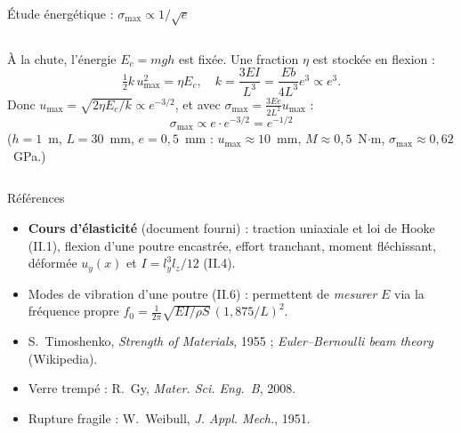 \documentclass[11pt,aspectratio=169]{beamer}
\begin{document}
\begin{frame}{Étude énergétique : $\sigma_{\max}\propto 1/\sqrt{e}$}
  \begin{columns}[c]
    \footnotesize
    À la chute, l'énergie $E_c=mgh$ est fixée. Une fraction $\eta$ est stockée en
    flexion :
    \[ \tfrac12 k\,u_{\max}^{2}=\eta E_c,\quad k=\frac{3EI}{L^{3}}=\frac{Eb}{4L^{3}}e^{3}\propto e^{3}. \]
    Donc $u_{\max}=\sqrt{2\eta E_c/k}\propto e^{-3/2}$, et avec
    $\sigma_{\max}=\frac{3Ee}{2L^{2}}u_{\max}$ :
    \[ \boxed{\;\sigma_{\max}\propto e\cdot e^{-3/2}=e^{-1/2}\;} \]
    \scriptsize ($h=1$~m, $L=30$~mm, $e=0{,}5$~mm : $u_{\max}\!\approx\!10$~mm,
    $M\!\approx\!0{,}5$~N$\cdot$m, $\sigma_{\max}\!\approx\!0{,}62$~GPa.)
  \end{columns}
\end{frame}

\begin{frame}{Références}
  \scriptsize
  \begin{itemize}\itemsep2pt
    \item \textbf{Cours d'élasticité} (document fourni) : traction uniaxiale et
          loi de Hooke (II.1), flexion d'une poutre encastrée, effort tranchant,
          moment fléchissant, déformée $u_y(x)$ et $I=l_y^{3}l_z/12$ (II.4).
    \item Modes de vibration d'une poutre (II.6) : permettent de \emph{mesurer}
          $E$ via la fréquence propre $f_0=\tfrac{1}{2\pi}\sqrt{EI/\rho S}\,(1{,}875/L)^{2}$.
    \item S.~Timoshenko, \emph{Strength of Materials}, 1955 ;
          \emph{Euler--Bernoulli beam theory} (Wikipedia).
    \item Verre trempé : R.~Gy, \emph{Mater. Sci. Eng.~B}, 2008.
    \item Rupture fragile : W.~Weibull, \emph{J. Appl. Mech.}, 1951.
  \end{itemize}
\end{frame}
\end{document}
